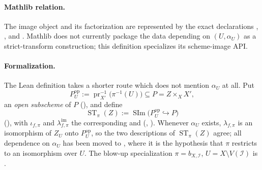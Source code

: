 \begin{definition}
  \paragraph{Mathlib relation.}
  The image object and its factorization are represented by the exact
  declarations \texttt{},
  \texttt{}, and
  \texttt{}.  Mathlib does not currently
  package the data depending on $(U,\alpha_U)$ as a strict-transform
  construction; this definition specializes its scheme-image API.

  \paragraph{Formalization.}
  The Lean definition takes a shorter route which does not mention $\alpha_U$ at all.
  Put
  \[
    P_U^{\mathrm{op}}
      :=\operatorname{pr}_{X'}^{-1}\bigl(\pi^{-1}(U)\bigr)\subseteq P
      =Z\times_XX',
  \]
  an \emph{open subscheme} of $P$
  (\texttt{}), and define
  \[
    \operatorname{ST}_\pi(Z)
      :=\operatorname{SIm}\bigl(P_U^{\mathrm{op}}\hookrightarrow P\bigr)
  \]
  (\texttt{}), with
  $\iota_{f,\pi}$ and $\lambda_{f,\pi}^{\mathrm{im}}$ the corresponding
  \texttt{} and \texttt{}
  (\texttt{},
  \texttt{}).  Whenever
  $\alpha_U$ exists, $\lambda_{f,\pi}$ is an isomorphism of $Z_U$ onto
  $P_U^{\mathrm{op}}$, so the two descriptions of $\operatorname{ST}_\pi(Z)$
  agree; all dependence on $\alpha_U$ has been moved to
  , where it is the hypothesis
  that $\pi$ restricts to an isomorphism over $U$.  The blow-up specialization
  $\pi=b_{X,\mathcal I}$, $U=X\setminus V(\mathcal I)$ is
  \texttt{}.
\end{definition}

